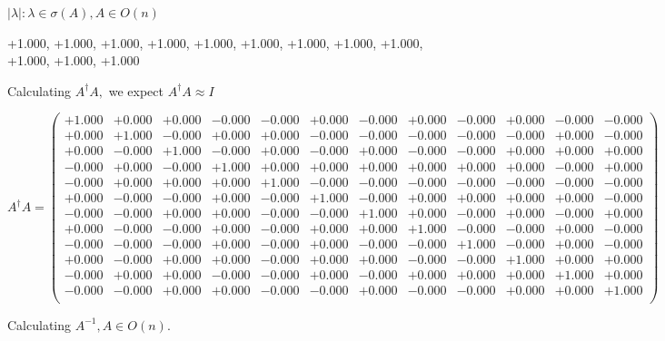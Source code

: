 \documentclass[9pt]{article}
\theoremstyle{plain}
\theoremstyle{definition}
\theoremstyle{remark}
\numberwithin{equation}{section}
\begin{document}
 $|\lambda | : \lambda \in \sigma(A) , A \in O(n)$

+1.000, +1.000, +1.000, +1.000, +1.000, +1.000, +1.000, +1.000, +1.000, +1.000, +1.000, +1.000


Calculating $A^{\dag} A,$  we expect $A^{\dag} A \approx I$

$A^{\dag} A = \left(
\begin{array}{
cccccccccccc}
+1.000 & +0.000 & +0.000 & -0.000 & -0.000 & +0.000 & -0.000 & +0.000 & -0.000 & +0.000 & -0.000 & -0.000 \\
+0.000 & +1.000 & -0.000 & +0.000 & +0.000 & -0.000 & -0.000 & -0.000 & -0.000 & -0.000 & +0.000 & -0.000 \\
+0.000 & -0.000 & +1.000 & -0.000 & +0.000 & -0.000 & +0.000 & -0.000 & -0.000 & +0.000 & +0.000 & +0.000 \\
-0.000 & +0.000 & -0.000 & +1.000 & +0.000 & +0.000 & +0.000 & +0.000 & +0.000 & +0.000 & -0.000 & +0.000 \\
-0.000 & +0.000 & +0.000 & +0.000 & +1.000 & -0.000 & -0.000 & -0.000 & -0.000 & -0.000 & -0.000 & -0.000 \\
+0.000 & -0.000 & -0.000 & +0.000 & -0.000 & +1.000 & -0.000 & +0.000 & +0.000 & +0.000 & +0.000 & -0.000 \\
-0.000 & -0.000 & +0.000 & +0.000 & -0.000 & -0.000 & +1.000 & +0.000 & -0.000 & +0.000 & -0.000 & +0.000 \\
+0.000 & -0.000 & -0.000 & +0.000 & -0.000 & +0.000 & +0.000 & +1.000 & -0.000 & -0.000 & +0.000 & -0.000 \\
-0.000 & -0.000 & -0.000 & +0.000 & -0.000 & +0.000 & -0.000 & -0.000 & +1.000 & -0.000 & +0.000 & -0.000 \\
+0.000 & -0.000 & +0.000 & +0.000 & -0.000 & +0.000 & +0.000 & -0.000 & -0.000 & +1.000 & +0.000 & +0.000 \\
-0.000 & +0.000 & +0.000 & -0.000 & -0.000 & +0.000 & -0.000 & +0.000 & +0.000 & +0.000 & +1.000 & +0.000 \\
-0.000 & -0.000 & +0.000 & +0.000 & -0.000 & -0.000 & +0.000 & -0.000 & -0.000 & +0.000 & +0.000 & +1.000 \\
\end{array}
\right)$ \newline 

Calculating $A^{-1} ,  A \in O(n)$.
\end{document}
